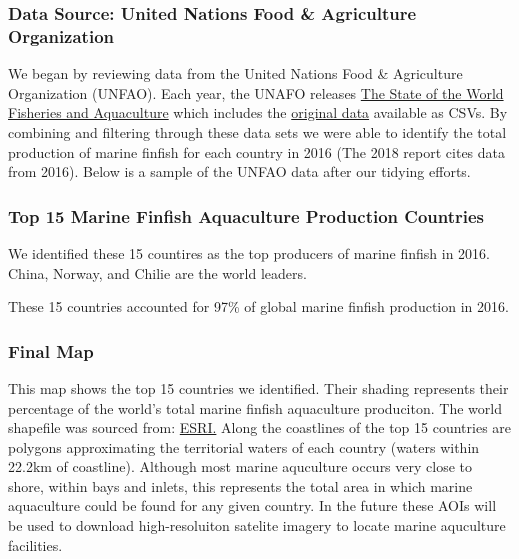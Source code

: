 \documentclass[]{article}
\begin{document}
\subsubsection{Data Source: United Nations Food \& Agriculture
Organization}\label{data-source-united-nations-food-agriculture-organization}

We began by reviewing data from the United Nations Food \& Agriculture
Organization (UNFAO). Each year, the UNAFO releases
\href{http://www.fao.org/state-of-fisheries-aquaculture/en/}{The State
of the World Fisheries and Aquaculture} which includes the
\href{http://www.fao.org/fishery/statistics/global-aquaculture-production/en}{original
data} available as CSVs. By combining and filtering through these data
sets we were able to identify the total production of marine finfish for
each country in 2016 (The 2018 report cites data from 2016). Below is a
sample of the UNFAO data after our tidying efforts.

\subsubsection{Top 15 Marine Finfish Aquaculture Production
Countries}\label{top-15-marine-finfish-aquaculture-production-countries}

We identified these 15 countires as the top producers of marine finfish
in 2016. China, Norway, and Chilie are the world leaders.

These 15 countries accounted for 97\% of global marine finfish
production in 2016.

\subsubsection{Final Map}\label{final-map}

This map shows the top 15 countries we identified. Their shading
represents their percentage of the world's total marine finfish
aquaculture produciton. The world shapefile was sourced from:
\href{https://hub.arcgis.com/datasets/252471276c9941729543be8789e06e12_0?geometry=-163.125\%2C-46.149\%2C196.875\%2C57.646}{ESRI.}
Along the coastlines of the top 15 countries are polygons approximating
the territorial waters of each country (waters within 22.2km of
coastline). Although most marine aquculture occurs very close to shore,
within bays and inlets, this represents the total area in which marine
aquaculture could be found for any given country. In the future these
AOIs will be used to download high-resoluiton satelite imagery to locate
marine aquculture facilities.
\end{document}
